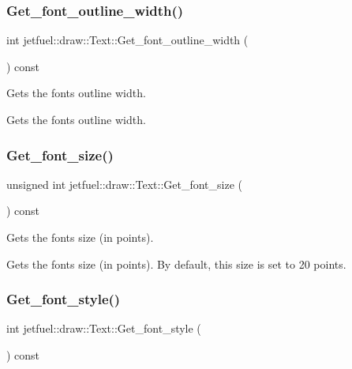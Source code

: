 \subsubsection{\texorpdfstring{Get\+\_\+font\+\_\+outline\+\_\+width()}{Get\_font\_outline\_width()}}
{\footnotesize\ttfamily int jetfuel\+::draw\+::\+Text\+::\+Get\+\_\+font\+\_\+outline\+\_\+width (\begin{DoxyParamCaption}{ }\end{DoxyParamCaption}) const\hspace{0.3cm}{\ttfamily [inline]}}



Gets the font\textquotesingle{}s outline width. 

Gets the font\textquotesingle{}s outline width. \mbox{\label{classjetfuel_1_1draw_1_1Text_aeb691f0eb368473f5691895212daf431}} 
\subsubsection{\texorpdfstring{Get\+\_\+font\+\_\+size()}{Get\_font\_size()}}
{\footnotesize\ttfamily unsigned int jetfuel\+::draw\+::\+Text\+::\+Get\+\_\+font\+\_\+size (\begin{DoxyParamCaption}{ }\end{DoxyParamCaption}) const\hspace{0.3cm}{\ttfamily [inline]}}



Gets the font\textquotesingle{}s size (in points). 

Gets the font\textquotesingle{}s size (in points). By default, this size is set to 20 points. \mbox{\label{classjetfuel_1_1draw_1_1Text_ade8bf8912e12bfae87a47f15e312f3f0}} 
\subsubsection{\texorpdfstring{Get\+\_\+font\+\_\+style()}{Get\_font\_style()}}
{\footnotesize\ttfamily int jetfuel\+::draw\+::\+Text\+::\+Get\+\_\+font\+\_\+style (\begin{DoxyParamCaption}{ }\end{DoxyParamCaption}) const\hspace{0.3cm}{\ttfamily [inline]}}



